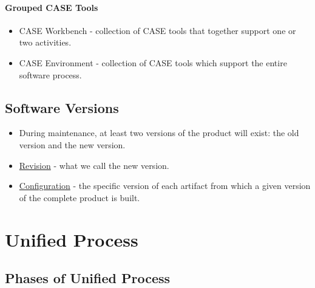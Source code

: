 \documentclass{report}
\begin{document}
				\subsubsection{Grouped CASE Tools}
					\begin{itemize}
						\item CASE Workbench - collection of CASE tools that together support one or two activities.
						\item CASE Environment - collection of CASE tools which support the entire software process.
					\end{itemize}
		\section{Software Versions}
			\begin{itemize}
				\item During maintenance, at least two versions of the product will exist: the old version and the new version.
				\item \underline{Revision} - what we call the new version.
				\item \underline{Configuration} - the specific version of each artifact from which a given version of the complete product is built.
			\end{itemize}
	\chapter{Unified Process}
		\section{Phases of Unified Process}
\end{document}
